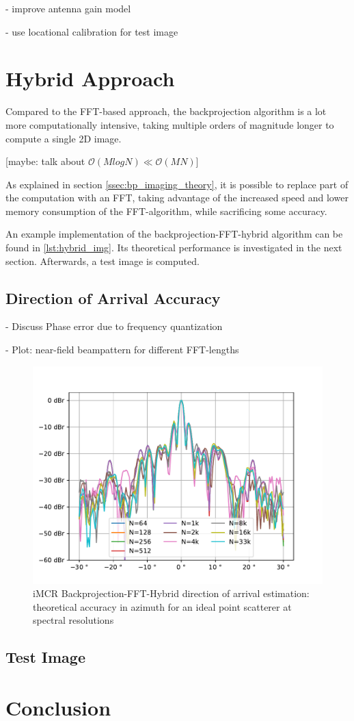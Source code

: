 - improve antenna gain model

- use locational calibration for test image

\section{Hybrid Approach}

Compared to the FFT-based approach, the backprojection algorithm is a lot more computationally intensive,
taking multiple orders of magnitude longer to compute a single 2D image.

    [maybe: talk about $\mathcal O(MlogN) \ll \mathcal O(MN)$]

As explained in section \ref{ssec:bp_imaging_theory},
it is possible to replace part of the computation with an FFT,
taking advantage of the increased speed and lower memory consumption of the FFT-algorithm,
while sacrificing some accuracy.

An example implementation of the backprojection-FFT-hybrid algorithm can be found in \ref{lst:hybrid_img}.
Its theoretical performance is investigated in the next section. Afterwards, a test image is computed.
\subsection{Direction of Arrival Accuracy}

- Discuss Phase error due to frequency quantization

- Plot: near-field beampattern for different FFT-lengths

\begin{figure}[h]
    \centering
    \includegraphics[width=\textwidth]{../figures/hybrid_azm_peak.pdf}
    \caption{iMCR Backprojection-FFT-Hybrid direction of arrival estimation: theoretical accuracy in azimuth for an ideal point scatterer at spectral resolutions}
    \label{fig:hybrid_azm_peak}
\end{figure}

\subsection{Test Image}

\section{Conclusion}


